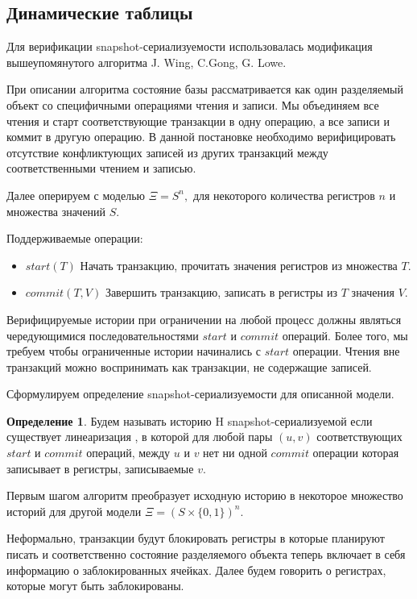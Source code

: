 \documentclass[pdftex,ptm,14pt,a4paper]{extreport}
\theoremstyle{definition}
\newtheorem{definition}{Определение}[chapter]
\begin{document}
\subsection{Динамические таблицы}
\label{dt-verify}
Для верификации snapshot-сериализуемости использовалась модификация вышеупомянутого алгоритма
J. Wing, C.Gong, G. Lowe.

При описании алгоритма состояние базы рассматривается как один разделяемый объект со специфичными
операциями чтения и записи. Мы объединяем все чтения и старт соответствующие транзакции в
одну операцию, а все записи и коммит в другую операцию. В данной постановке необходимо верифицировать отсутствие конфликтующих
записей из других транзакций между соответственными чтением и записью.

Далее оперируем с моделью
$\Xi = S^n,$ для некоторого количества регистров $n$ и множества значений $S.$

Поддерживаемые операции:
\begin{itemize}
    \item{$start(T)$} Начать транзакцию, прочитать значения регистров из множества $T$.
    \item{$commit(T, V)$} Завершить транзакцию, записать в регистры из $T$ значения $V$.
\end{itemize}

Верифицируемые истории при ограничении на любой процесс должны являться чередующимися последовательностями
$start$ и $commit$ операций. Более того, мы требуем чтобы ограниченные истории начинались с $start$ операции.
Чтения вне транзакций можно воспринимать как транзакции, не содержащие записей.

Сформулируем определение snapshot-сериализуемости для описанной модели.

\begin{definition}
    \label{snapshot-def}
    Будем называть историю H snapshot-сериализуемой если существует линеаризация \cite{linearizable},
    в которой для любой пары $(u, v)$ соответствующих $start$ и $commit$ операций, между $u$ и $v$ нет ни одной
    $commit$ операции которая записывает в регистры, записываемые $v$.
\end{definition}

Первым шагом алгоритм преобразует исходную историю в некоторое множество историй для другой модели
$\Xi = (S\times\{0, 1\})^n.$

Неформально, транзакции будут блокировать регистры в которые планируют писать и соответственно
состояние разделяемого объекта теперь включает в себя информацию о заблокированных ячейках.
Далее будем говорить о регистрах, которые могут быть заблокированы.
\end{document}
